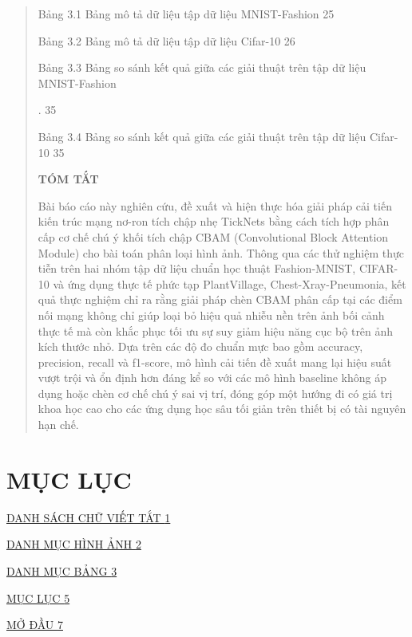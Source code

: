 \documentclass[
]{article}
\begin{document}
\begin{quote}
Bảng 3.1 Bảng mô tả dữ liệu tập dữ liệu MNIST-Fashion 25

Bảng 3.2 Bảng mô tả dữ liệu tập dữ liệu Cifar-10 26

Bảng 3.3 Bảng so sánh kết quả giữa các giải thuật trên tập dữ liệu
MNIST-Fashion

. 35

Bảng 3.4 Bảng so sánh kết quả giữa các giải thuật trên tập dữ liệu
Cifar-10 35

\textbf{TÓM TẮT}

Bài báo cáo này nghiên cứu, đề xuất và hiện thực hóa giải pháp cải tiến
kiến trúc mạng nơ-ron tích chập nhẹ TickNets bằng cách tích hợp phân cấp
cơ chế chú ý khối tích chập CBAM (Convolutional Block Attention Module)
cho bài toán phân loại hình ảnh. Thông qua các thử nghiệm thực tiễn trên
hai nhóm tập dữ liệu chuẩn học thuật Fashion-MNIST, CIFAR-10 và ứng dụng
thực tế phức tạp PlantVillage, Chest-Xray-Pneumonia, kết quả thực nghiệm
chỉ ra rằng giải pháp chèn CBAM phân cấp tại các điểm nối mạng không chỉ
giúp loại bỏ hiệu quả nhiễu nền trên ảnh bối cảnh thực tế mà còn khắc
phục tối ưu sự suy giảm hiệu năng cục bộ trên ảnh kích thước nhỏ. Dựa
trên các độ đo chuẩn mực bao gồm accuracy, precision, recall và
f1-score, mô hình cải tiến đề xuất mang lại hiệu suất vượt trội và ổn
định hơn đáng kể so với các mô hình baseline không áp dụng hoặc chèn cơ
chế chú ý sai vị trí, đóng góp một hướng đi có giá trị khoa học cao cho
các ứng dụng học sâu tối giản trên thiết bị có tài nguyên hạn chế.
\end{quote}

\hypertarget{mux1ee5c-lux1ee5c}{%
\section{MỤC LỤC}\label{mux1ee5c-lux1ee5c}}

\protect\hyperlink{danh-suxe1ch-chux1eef-viux1ebft-tux1eaft}{DANH SÁCH
CHỮ VIẾT TẮT
\protect\hyperlink{danh-suxe1ch-chux1eef-viux1ebft-tux1eaft}{1}}

\protect\hyperlink{danh-mux1ee5c-huxecnh-ux1ea3nh}{DANH MỤC HÌNH ẢNH
\protect\hyperlink{danh-mux1ee5c-huxecnh-ux1ea3nh}{2}}

\protect\hyperlink{danh-mux1ee5c-bux1ea3ng}{DANH MỤC BẢNG
\protect\hyperlink{danh-mux1ee5c-bux1ea3ng}{3}}

\protect\hyperlink{_Toc235870340}{MỤC LỤC
\protect\hyperlink{_Toc235870340}{5}}

\protect\hyperlink{mux1edf-ux111ux1ea7u}{MỞ ĐẦU
\protect\hyperlink{mux1edf-ux111ux1ea7u}{7}}
\end{document}
